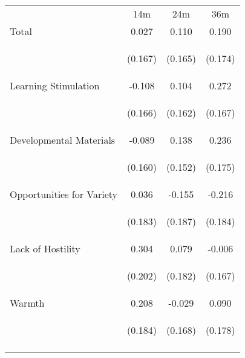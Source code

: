 \begin{tabular}{lccc}
\hline \noalign{\smallskip} & 14m & 24m & 36m\\
\noalign{\smallskip}\hline \noalign{\smallskip}Total & 0.027 & 0.110 & 0.190\\
 & \begin{footnotesize}(0.167)\end{footnotesize} & \begin{footnotesize}(0.165)\end{footnotesize} & \begin{footnotesize}(0.174)\end{footnotesize}\\
\noalign{\smallskip}Learning Stimulation & -0.108 & 0.104 & 0.272\\
 & \begin{footnotesize}(0.166)\end{footnotesize} & \begin{footnotesize}(0.162)\end{footnotesize} & \begin{footnotesize}(0.167)\end{footnotesize}\\
\noalign{\smallskip}Developmental Materials & -0.089 & 0.138 & 0.236\\
 & \begin{footnotesize}(0.160)\end{footnotesize} & \begin{footnotesize}(0.152)\end{footnotesize} & \begin{footnotesize}(0.175)\end{footnotesize}\\
\noalign{\smallskip}Opportunities for Variety & 0.036 & -0.155 & -0.216\\
 & \begin{footnotesize}(0.183)\end{footnotesize} & \begin{footnotesize}(0.187)\end{footnotesize} & \begin{footnotesize}(0.184)\end{footnotesize}\\
\noalign{\smallskip}Lack of Hostility & 0.304 & 0.079 & -0.006\\
 & \begin{footnotesize}(0.202)\end{footnotesize} & \begin{footnotesize}(0.182)\end{footnotesize} & \begin{footnotesize}(0.167)\end{footnotesize}\\
\noalign{\smallskip}Warmth & 0.208 & -0.029 & 0.090\\
 & \begin{footnotesize}(0.184)\end{footnotesize} & \begin{footnotesize}(0.168)\end{footnotesize} & \begin{footnotesize}(0.178)\end{footnotesize}\\
\noalign{\smallskip}\hline\end{tabular}\\
